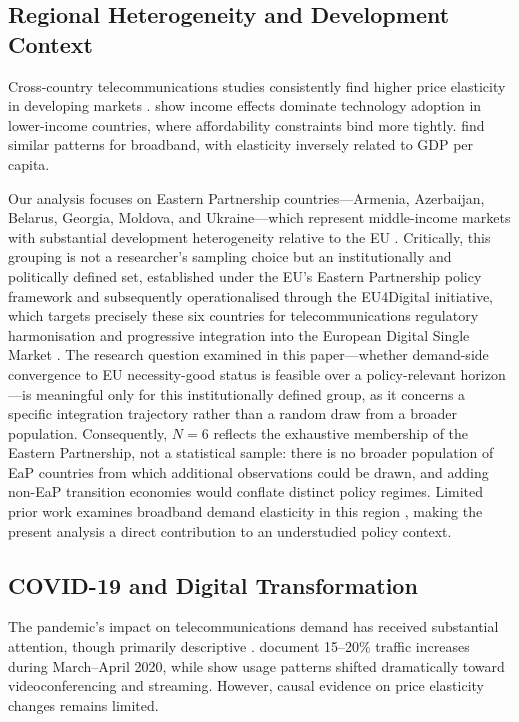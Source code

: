 \subsection{Regional Heterogeneity and Development Context}

Cross-country telecommunications studies consistently find higher price elasticity in developing markets \citep{waverman2001telecommunications, katz2010impact}. \citet{roller2001telecommunications} show income effects dominate technology adoption in lower-income countries, where affordability constraints bind more tightly. \citet{bertschek2016drivers} find similar patterns for broadband, with elasticity inversely related to GDP per capita.

Our analysis focuses on Eastern Partnership countries---Armenia, Azerbaijan, Belarus, 
Georgia, Moldova, and Ukraine---which represent 
middle-income markets with substantial development 
heterogeneity relative to the EU \citep{ecorys2013evaluation}. Critically, 
this grouping is not a researcher's 
sampling choice but an institutionally and politically defined set, 
established under the EU's Eastern Partnership policy framework and 
subsequently operationalised through the EU4Digital initiative, 
which targets precisely these six countries for telecommunications regulatory 
harmonisation and progressive integration into the European Digital Single Market \citep{european2021eap}. The research question examined in this paper---whether demand-side convergence to EU necessity-good status is feasible over a policy-relevant horizon---is meaningful only for this institutionally defined group, as it concerns a specific integration trajectory rather than a random draw from a broader population. Consequently, $N{=}6$ reflects the exhaustive membership of the Eastern Partnership, not a statistical sample: there is no broader population of EaP countries from which additional observations could be drawn, and adding non-EaP transition economies would conflate distinct policy regimes. Limited prior work examines broadband demand elasticity in this region \citep{koutroumpis2009impact}, making the present analysis a direct contribution to an understudied policy context.

\subsection{COVID-19 and Digital Transformation}

The pandemic's impact on telecommunications demand has received substantial attention, though primarily descriptive \citep{oecd2021covid, iab2020internet}. \citet{feldmann2021year} document 15--20\% traffic increases during March--April 2020, while \citet{favale2020campus} show usage patterns shifted dramatically toward videoconferencing and streaming. However, causal evidence on price elasticity changes remains limited.

